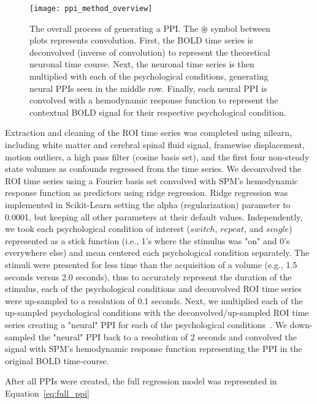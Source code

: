 \documentclass[phd,appendix,figures]{uithesis}
\begin{document}
\begin{figure}[H]
  \centering
  \texttt{[image: ppi\_method\_overview]}
  \caption[Example computation of several PPIs]{
    The overall process of generating a PPI.
    The $\circledast$ symbol between plots represents convolution.
    First, the BOLD time series is deconvolved (inverse of convolution)
    to represent the theoretical neuronal time course.
    Next, the neuronal time series is then multiplied with each of the psychological
    conditions, generating neural PPIs seen in the middle row.
    Finally, each neural PPI is convolved with a hemodynamic response function
    to represent the contextual BOLD signal for their respective psychological
    condition.
  }
  \label{fig:ppi_method_overview}
\end{figure}

Extraction and cleaning of the ROI time series was completed using nilearn,
including white matter and cerebral spinal fluid signal, framewise displacement,
motion outliers, a high pass filter (cosine basis set), and the first four non-steady state
volumes as confounds regressed from the time series.
We deconvolved the ROI time series using a Fourier basis set convolved with
SPM's hemodynamic response function as predictors using ridge regression.
Ridge regression was implemented in Scikit-Learn setting the alpha (regularization)
parameter to 0.0001, but keeping all other parameters at their default values.
Independently, we took each psychological condition of interest ($switch$, $repeat$, and $single$)
represented as a stick function (i.e., 1's where the stimulus was "on" and 0's everywhere else)
and mean centered each psychological condition separately.
The stimuli were presented for less time than the acquisition of a volume
(e.g., 1.5 seconds versus 2.0 seconds), thus to accurately represent the duration
of the stimulus, each of the psychological conditions and deconvolved ROI time series were up-sampled to
a resolution of 0.1 seconds.
Next, we multiplied each of the up-sampled psychological conditions with the deconvolved/up-sampled
ROI time series creating a "neural" PPI for each of the
psychological conditions~\cite{McLaren2012}.
We down-sampled the "neural" PPI back to a resolution of 2 seconds and convolved the signal with
SPM's hemodynamic response function representing the PPI in the original BOLD time-course.

After all PPIs were created, the full regression model was represented in Equation~\ref{eq:full_ppi}
\end{document}
